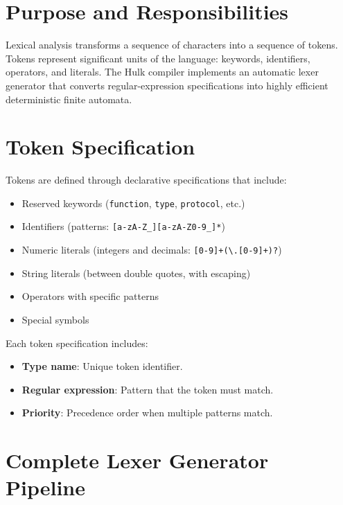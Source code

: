 \documentclass[12pt,a4paper]{report}
\begin{document}
\section{Purpose and Responsibilities}

Lexical analysis transforms a sequence of characters into a sequence of tokens.
Tokens represent significant units of the language: keywords, identifiers, operators, and literals.
The Hulk compiler implements an automatic lexer generator that converts regular-expression specifications into highly efficient deterministic finite automata.

\section{Token Specification}

Tokens are defined through declarative specifications that include:

\begin{itemize}
    \item Reserved keywords (\texttt{function}, \texttt{type}, \texttt{protocol}, etc.)
    \item Identifiers (patterns: \verb|[a-zA-Z_][a-zA-Z0-9_]*|)
    \item Numeric literals (integers and decimals: \verb|[0-9]+(\.[0-9]+)?|)
    \item String literals (between double quotes, with escaping)
    \item Operators with specific patterns
    \item Special symbols
\end{itemize}

Each token specification includes:
\begin{itemize}
    \item \textbf{Type name}: Unique token identifier.
    \item \textbf{Regular expression}: Pattern that the token must match.
    \item \textbf{Priority}: Precedence order when multiple patterns match.
\end{itemize}

\section{Complete Lexer Generator Pipeline}
\end{document}
